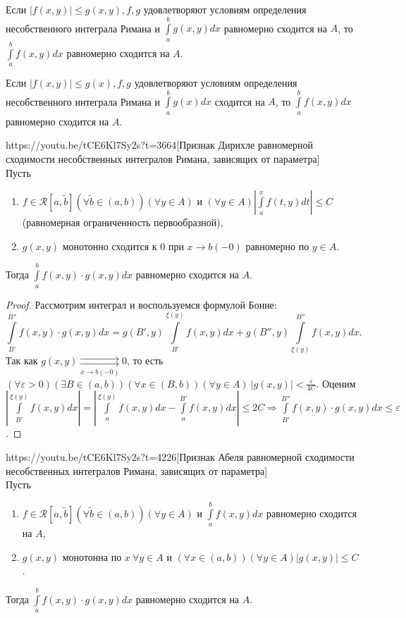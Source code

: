 \begin{corollary}
	Если $|f(x,y)|\leqslant g(x,y), f, g$ удовлетворяют условиям определения несобственного интеграла Римана и $\int
	\limits_a^b g(x,y)dx$ равномерно сходится на $A$, то $\int\limits_a^b f(x,y)dx$ равномерно сходится на $A$.
\end{corollary}
\begin{corollary}
	Если $|f(x,y)|\leqslant g(x), f, g$ удовлетворяют условиям определения несобственного интеграла Римана и $\int
	\limits_a^b g(x)dx$ сходится на $A$, то $\int\limits_a^b f(x,y)dx$ равномерно сходится на $A$.
\end{corollary}

\begin{linkthm}{https://youtu.be/tCE6Kl7Sy2s?t=3664}[Признак Дирихле равномерной сходимости несобственных интегралов Римана, зависящих от параметра]\ \\
	Пусть
	\begin{enumerate}
		\item $f\in\mathcal{R}[a, \widetilde{b}](\forall\widetilde{b}\in(a,b))(\forall y\in A)$ и $(\forall y\in A)\left|\int\limits_a^x f(t,y)dt\right|\leqslant C$ (равномерная ограниченность первообразной),
		\item $g(x,y)$ монотонно сходится к 0 при $x\to b(-0)$ равномерно по $y\in A$.
	\end{enumerate}
Тогда $\int\limits_a^b f(x,y)\cdot g(x,y)dx$ равномерно сходится на $A$.
\end{linkthm}

\begin{proof}
	Рассмотрим интеграл и воспользуемся формулой Бонне: $$\int\limits_{B'}^{B''}f(x,y)\cdot g(x,y)dx = g(B',y)\int\limits_{B'}^{\xi(y)}f(x,y)dx+g(B'',y)\int\limits_{\xi(y)}^{B''}f(x,y)dx.$$
	Так как $g(x,y)\underset{x\to b(-0)}{\rightrightarrows} 0$, то есть $(\forall\varepsilon>0)(\exists B\in(a,b))(\forall x\in (B,b))(\forall y\in A)\ |g(x,y)|<\frac{\varepsilon}{4C}$. Оценим $\left|\int\limits_{B'}^{\xi(y)}f(x,y)dx\right|=\left|\int\limits_{a}^{\xi(y)}f(x,y)dx-\int\limits_{a}^{B'}f(x,y)dx\right|\leqslant 2C\Rightarrow \int\limits_{B'}^{B''}f(x,y)\cdot g(x,y)dx\leqslant \varepsilon$.
\end{proof}

\begin{linkthm}{https://youtu.be/tCE6Kl7Sy2s?t=4226}[Признак Абеля равномерной сходимости несобственных интегралов Римана, зависящих от параметра]\ \\
Пусть
\begin{enumerate}
	\item $f\in\mathcal{R}[a, \widetilde{b}](\forall\widetilde{b}\in(a,b))(\forall y\in A)$ и $\int\limits_a^b f(x,y)dx$ равномерно сходится на $A$,
	\item $g(x,y)$ монотонна по $x\ \forall y\in A$ и $(\forall x\in (a,b))(\forall y\in A)|g(x,y)|\leqslant C$.
\end{enumerate}
Тогда $\int\limits_a^b f(x,y)\cdot g(x,y)dx$ равномерно сходится на $A$.
\end{linkthm}

